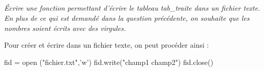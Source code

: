 \documentclass[10pt,oneside]{article}
\begin{document}
\subparagraph{}
\textit{Écrire une fonction permettant d'écrire le tableau \textsf{tab\_traite} dans un fichier texte. En plus de ce qui est demandé dans la question précédente, on souhaite que les nombres soient écrits avec des virgules.}

\begin{py}

Pour créer et écrire dans un fichier texte, on peut procéder ainsi :

\begin{python}
fid = open ("fichier.txt",'w')
fid.write("champ1 \tab champ2")
fid.close()
\end{python}

\end{py}
\end{document}
